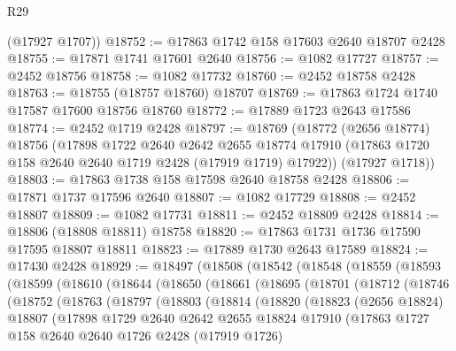 \begin{lexlean}{R29}
\begin{coremodule}
      (@17927 @1707))
@18752 := @17863 @1742 @158 @17603 @2640 @18707 @2428
@18755 := @17871 @1741 @17601 @2640
@18756 := @1082 @17727
@18757 := @2452 @18756
@18758 := @1082 @17732
@18760 := @2452 @18758 @2428
@18763 := @18755 (@18757 @18760) @18707
@18769 := @17863 @1724 @1740 @17587 @17600 @18756 @18760
@18772 := @17889 @1723 @2643 @17586
@18774 := @2452 @1719 @2428
@18797 := @18769
    (@18772
      (@2656 @18774)
      @18756
      (@17898
        @1722
        @2640
        @2642
        @2655
        @18774
        @17910
        (@17863 @1720 @158 @2640 @2640 @1719 @2428 (@17919 @1719) @17922))
      (@17927 @1718))
@18803 := @17863 @1738 @158 @17598 @2640 @18758 @2428
@18806 := @17871 @1737 @17596 @2640
@18807 := @1082 @17729
@18808 := @2452 @18807
@18809 := @1082 @17731
@18811 := @2452 @18809 @2428
@18814 := @18806 (@18808 @18811) @18758
@18820 := @17863 @1731 @1736 @17590 @17595 @18807 @18811
@18823 := @17889 @1730 @2643 @17589
@18824 := @17430 @2428
@18929 := @18497
    (@18508
      (@18542
        (@18548
          (@18559
            (@18593
              (@18599
                (@18610
                  (@18644
                    (@18650
                      (@18661
                        (@18695
                          (@18701
                            (@18712
                              (@18746
                                (@18752
                                  (@18763
                                    (@18797
                                      (@18803
                                        (@18814
                                          (@18820
                                            (@18823
                                              (@2656 @18824)
                                              @18807
                                              (@17898
                                                @1729
                                                @2640
                                                @2642
                                                @2655
                                                @18824
                                                @17910
                                                (@17863
                                                  @1727
                                                  @158
                                                  @2640
                                                  @2640
                                                  @1726
                                                  @2428
                                                  (@17919 @1726)

\end{coremodule}
\end{lexlean}
